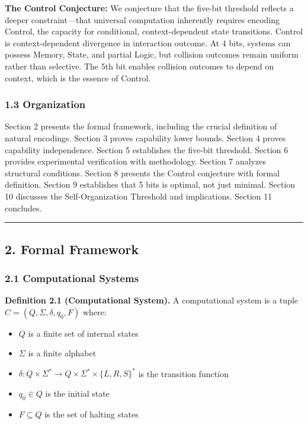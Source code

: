 \documentclass[
  11pt,
]{article}
\begin{document}
\textbf{The Control Conjecture:} We conjecture that the five-bit
threshold reflects a deeper constraint---that universal computation
inherently requires encoding Control, the capacity for conditional,
context-dependent state transitions. Control is context-dependent
divergence in interaction outcome. At 4 bits, systems can possess
Memory, State, and partial Logic, but collision outcomes remain uniform
rather than selective. The 5th bit enables collision outcomes to depend
on context, which is the essence of Control.

\hypertarget{organization}{%
\subsubsection{1.3 Organization}\label{organization}}

Section 2 presents the formal framework, including the crucial
definition of natural encodings. Section 3 proves capability lower
bounds. Section 4 proves capability independence. Section 5 establishes
the five-bit threshold. Section 6 provides experimental verification
with methodology. Section 7 analyzes structural conditions. Section 8
presents the Control conjecture with formal definition. Section 9
establishes that 5 bits is optimal, not just minimal. Section 10
discusses the Self-Organization Threshold and implications. Section 11
concludes.

\begin{center}\rule{0.5\linewidth}{0.5pt}\end{center}

\hypertarget{formal-framework}{%
\subsection{2. Formal Framework}\label{formal-framework}}

\hypertarget{computational-systems}{%
\subsubsection{2.1 Computational Systems}\label{computational-systems}}

\textbf{Definition 2.1 (Computational System).} A computational system
is a tuple $C = (Q, \Sigma, \delta, q_0, F)$ where:
\begin{itemize}
\item $Q$ is a finite set of internal states
\item $\Sigma$ is a finite alphabet
\item $\delta: Q \times \Sigma^* \rightarrow Q \times \Sigma^* \times \{L, R, S\}^*$ is the transition function
\item $q_0 \in Q$ is the initial state
\item $F \subseteq Q$ is the set of halting states
\end{itemize}
\end{document}
